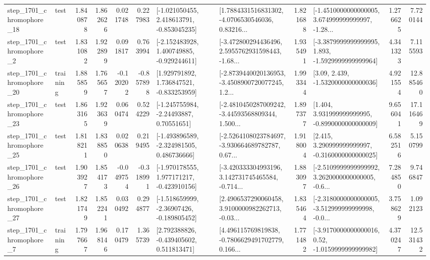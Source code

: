 \begin{tabular}{llrrrrllrlrr}
 step\_1701\_chromophore\_18 &      test &      1.840878 &    1.862626 &      0.021748 &  0.227983 &   [-1.021050455, 2.418613791, -0.853045235] &  [1.7884331516831302, -4.0706530546036, 0.83216... &       1.821688 &  [-1.4510000000000005, 3.674999999999997, -1.28... &            1.276625 &          7.720144 \\
  step\_1701\_chromophore\_2 &      test &      1.831082 &    1.922899 &      0.091817 &  0.763994 &   [-2.152483928, 1.400749885, -0.929244611] &  [-3.472800294436496, 2.5955762931598443, -1.68... &       1.935491 &  [-3.3879999999999995, 1.893, -1.5929999999999964] &            4.341323 &          7.115593 \\
 step\_1701\_chromophore\_20 &  training &      1.885859 &    1.765657 &     -0.120202 & -0.857898 &    [1.929791892, 1.736847521, -0.833253959] &  [-2.8739440020136953, -3.4508900720077245, 1.2... &       1.993344 &                 [3.09, 2.439, -1.5320000000000036] &            4.921554 &         12.885460 \\
 step\_1701\_chromophore\_23 &      test &      1.863165 &    1.923639 &      0.060474 &  0.524229 &     [-1.245755984, -2.24493887, 0.70551651] &  [-2.4810450287009242, -3.44593568809344, 1.500... &       1.897377 &    [1.404, 3.931999999999995, -0.8990000000000009] &            9.656041 &         17.116469 \\
 step\_1701\_chromophore\_25 &      test &      1.818211 &    1.838850 &      0.020638 &  0.219495 &   [-1.493896589, -2.324981505, 0.486736666] &  [-2.5264108023784697, -3.930664689782787, 0.67... &       1.918004 &    [2.415, 3.290999999999997, -0.3160000000000025] &            6.582516 &          5.150799 \\
 step\_1701\_chromophore\_26 &      test &      1.903927 &    1.854173 &     -0.049754 & -0.318991 &   [-1.970178555, 1.977171217, -0.423910156] &  [-3.420333304993196, 3.142731745465584, -0.714... &       1.883097 &  [-2.5109999999999992, 3.2620000000000005, -0.6... &            7.284850 &          9.746847 \\
 step\_1701\_chromophore\_27 &      test &      1.821749 &    1.852241 &      0.030492 &  0.294877 &   [-1.518659999, -2.36907426, -0.189805452] &  [2.4906537290060458, 3.9100000982262713, -0.03... &       1.835464 &  [-2.3180000000000005, -3.512999999999998, -0.0... &            3.758629 &          1.092123 \\
  step\_1701\_chromophore\_7 &  training &      1.797667 &    1.968146 &      0.170479 &  1.365739 &    [2.792388826, -0.439405602, 0.511813471] &  [4.496115769819838, -0.7806629491702779, 0.166... &       1.771482 &   [-3.9170000000000016, 0.52, -1.0159999999999982] &            4.370247 &         12.531432 \\

\end{tabular}
